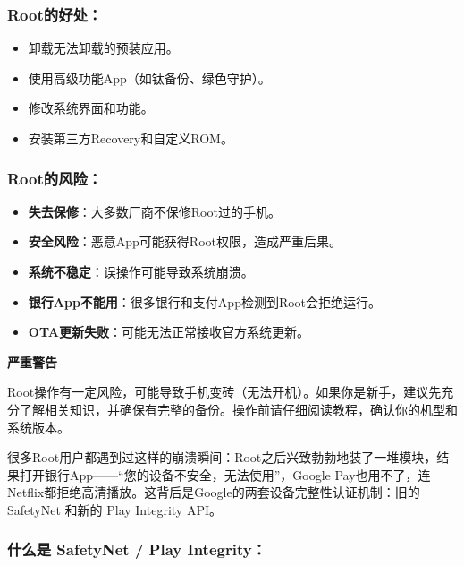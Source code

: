 \subsubsection*{Root的好处：}

\begin{itemize}
  \item 卸载无法卸载的预装应用。
  \item 使用高级功能App（如钛备份、绿色守护）。
  \item 修改系统界面和功能。
  \item 安装第三方Recovery和自定义ROM。
\end{itemize}

\subsubsection*{Root的风险：}

\begin{itemize}
  \item \textbf{失去保修}：大多数厂商不保修Root过的手机。
  \item \textbf{安全风险}：恶意App可能获得Root权限，造成严重后果。
  \item \textbf{系统不稳定}：误操作可能导致系统崩溃。
  \item \textbf{银行App不能用}：很多银行和支付App检测到Root会拒绝运行。
  \item \textbf{OTA更新失败}：可能无法正常接收官方系统更新。
\end{itemize}

\textbf{严重警告}\par

Root操作有一定风险，可能导致手机变砖（无法开机）。如果你是新手，建议先充分了解相关知识，并确保有完整的备份。操作前请仔细阅读教程，确认你的机型和系统版本。


很多Root用户都遇到过这样的崩溃瞬间：Root之后兴致勃勃地装了一堆模块，结果打开银行App——“您的设备不安全，无法使用”，Google Pay也用不了，连Netflix都拒绝高清播放。这背后是Google的两套设备完整性认证机制：旧的 SafetyNet 和新的 Play Integrity API。

\subsubsection*{什么是 SafetyNet / Play Integrity：}

